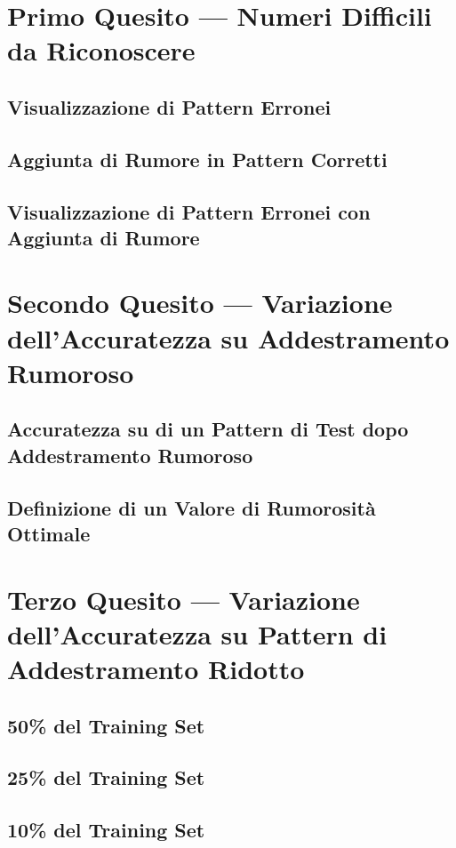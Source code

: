 \documentclass[12pt, a4paper]{article}
\begin{document}
\newpage
\section{Primo Quesito --- Numeri Difficili da Riconoscere}
\subsection{Visualizzazione di Pattern Erronei}
\subsection{Aggiunta di Rumore in Pattern Corretti}
\subsection{Visualizzazione di Pattern Erronei con Aggiunta di Rumore}

\newpage
\section{Secondo Quesito --- Variazione dell'Accuratezza su Addestramento Rumoroso}
\subsection{Accuratezza su di un Pattern di Test dopo Addestramento Rumoroso}
\subsection{Definizione di un Valore di Rumorosità Ottimale}

\newpage
\section{Terzo Quesito --- Variazione dell'Accuratezza su Pattern di Addestramento Ridotto}
\subsection{50\% del Training Set}
\subsection{25\% del Training Set}
\subsection{10\% del Training Set}
\end{document}
